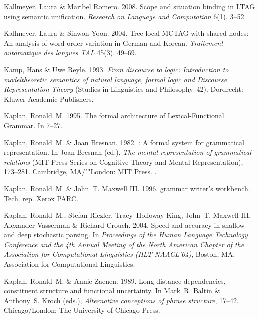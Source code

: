 \begin{thebibliography}{1420}
Kallmeyer, Laura \& Maribel Romero. 2008.
\newblock Scope and situation binding in {LTAG} using semantic unification.
\newblock \emph{Research on Language and Computation} 6(1). 3--52.

Kallmeyer, Laura \& Sinwon Yoon. 2004.
\newblock Tree-local {MCTAG} with shared nodes: {An} analysis of word order
  variation in {German and Korean}.
\newblock \emph{Traitement automatique des langues TAL} 45(3). 49--69.

Kamp, Hans \& Uwe Reyle. 1993.
\newblock \emph{From discourse to logic: {Introduction} to modeltheoretic
  semantics of natural language, formal logic and {Discourse Representation
  Theory}} (Studies in Linguistics and Philosophy~42).
\newblock Dordrecht: Kluwer Academic Publishers.

Kaplan, Ronald~M. 1995.
\newblock The formal architecture of {Lexical-Functional Grammar}.
\newblock In  \cite{DKMZ95a-ed} 7--27.

Kaplan, Ronald~M. \& Joan Bresnan. 1982.
: {A} formal system for grammatical
  representation.
\newblock In Joan Bresnan (ed.), \emph{The mental representation of grammatical
  relations}  (MIT Press Series on Cognitive Theory and Mental Representation),
  173--281. Cambridge, MA/""London: MIT Press.
\newblock \reprintin {}.

Kaplan, Ronald~M. \& John~T. {Maxwell III}. 1996.
 grammar writer's workbench.
\newblock Tech. rep. Xerox PARC.

Kaplan, Ronald~M., Stefan Riezler, Tracy~Holloway King, John~T. {Maxwell III},
  Alexander Vasserman \& Richard Crouch. 2004.
\newblock Speed and accuracy in shallow and deep stochastic parsing.
\newblock In \emph{Proceedings of the {Human Language Technology Conference and
  the 4th Annual Meeting of the North American Chapter of the Association for
  Computational Linguistics (HLT-NAACL'04)}}, Boston, MA: Association for
  Computational Linguistics.

Kaplan, Ronald~M. \& Annie Zaenen. 1989.
\newblock Long-distance dependencies, constituent structure and functional
  uncertainty.
\newblock In Mark~R. Baltin \& Anthony~S. Kroch (eds.), \emph{Alternative
  conceptions of phrase structure}, 17--42. Chicago/London: The University of
  Chicago Press.


\end{thebibliography}
